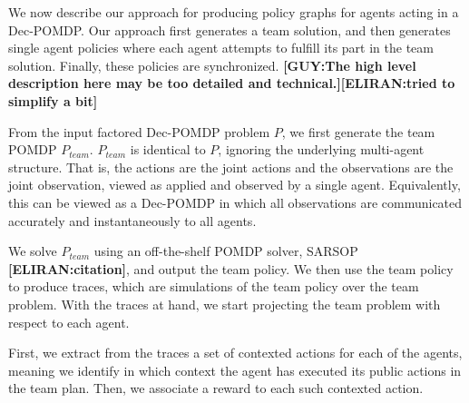 \documentclass[letterpaper]{article} %
\newcommand{\eliran}[1]{\textbf{[\color{red}ELIRAN:#1]}}
\newcommand{\guy}[1]{\textbf{[\color{orange}GUY:#1]}}
\begin{document}
We now describe our approach for producing policy graphs for agents acting in a Dec-POMDP. Our approach first generates a team solution, and then generates single agent policies where each agent attempts to fulfill its part in the team solution. Finally, these policies are synchronized. 
\guy{The high level description here may be too detailed and technical.}\eliran{tried to simplify a bit}

From the input factored Dec-POMDP problem $P$, we first generate the team POMDP $P_{team}$. $P_{team}$ is identical to $P$, ignoring the underlying multi-agent structure. That is, the actions are the joint actions and the observations are the joint observation, viewed as applied 
and observed by a single agent. Equivalently, this can be viewed as a Dec-POMDP in which all observations are communicated accurately and instantaneously 
to all agents.

We solve $P_{team}$ using an off-the-shelf POMDP solver, SARSOP \cite{} \eliran{citation}, and output the team policy. We then use the team policy to produce traces, which are simulations of the team policy over the team problem. With the traces at hand, we start projecting the team problem with respect to each agent.

First, we extract from the traces a set of contexted actions for each of the agents, meaning we identify in which context the agent has executed its public actions in the team plan. Then, we associate a reward to each such contexted action.
\end{document}
